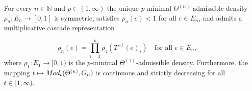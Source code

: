 \documentclass[10pt,a4paper]{amsart}
\newcommand{\Mod}{{\rm Mod}}
\newcommand{\N}{\mathbb{N}}
\begin{document}
\begin{lemma}\label{Lemma: Optimal Density}
    For every \(n\in\N\) and \(p\in(1,\infty)\) the unique \(p\)-minimal \(\Theta^{(n)}\)-admissible density \(\rho_n\colon E_n\to[0,1]\) is symmetric, satisfies \(\rho_n(e)<1\) for all \(e\in E_n\), and admits a multiplicative cascade representation
    
        \begin{equation}\label{Equation: Optimal density is a cascade}
            \rho_n(e)=\prod_{i=1}^n\rho_1(T^{-1}(e)_i)\quad\text{for all }e\in E_n,
        \end{equation}
    where \(\rho_1\colon E_1\to [0,1)\) is the \(p\)-minimal \(\Theta^{(1)}\)-admissible density. Furthermore, the mapping \(t\mapsto\Mod_t(\Theta^{(n)},G_n)\) is continuous and strictly decreasing for all \(t\in[1,\infty)\).
\end{lemma}
\end{document}
